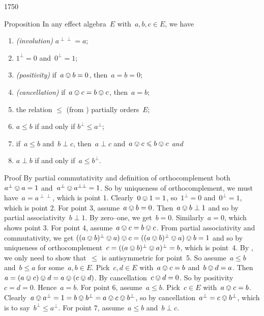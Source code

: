 \begin{parsec}{1750}
\begin{point}{50}{Proposition}%
In any effect algebra~$E$ with~$a,b,c\in E$, we have
\begin{enumerate}
    \item \emph{(involution)}
        $a^{\perp\perp} = a$;
    \item
        $1^\perp= 0$ and~$0^\perp = 1$;
    \item \emph{(positivity)}
        if~$a\ovee b = 0$, then~$a = b= 0$;
    \item \emph{(cancellation)}
        if~$a\ovee c = b\ovee c$, then~$a = b$;
    \item the relation  $\leq$ (from ) partially orders~$E$;
    \item $a \leq b$ if and only if $b^\perp \leq a^\perp$;
    \item if~$a \leq b$ and~$b \perp c$, then~$a \perp c$
        and~$a \ovee c \leq b \ovee c$ \emph{and}
    \item $a \perp b$ if and only if~$a \leq b^\perp$.
\end{enumerate}
\begin{point}{60}{Proof}%
By partial commutativity and definition
of orthocomplement both~$a^\perp \ovee a = 1$
and~$a^\perp \ovee  a^{\perp\perp} = 1$.
So by uniqueness of orthocomplement,
    we must have~$a= a^{\perp\perp}$, which is point 1.
Clearly~$0 \ovee 1 = 1$,
    so~$1^\perp = 0$ and~$0^\perp = 1$,
    which is point 2.
For point 3, assume~$a \ovee b = 0$.
Then~$a \ovee b \perp 1$
    and so by partial associativity~$b \perp 1$.
    By zero--one, we get~$b = 0$.
    Similarly~$a=0$, which shows point 3.
For point 4, assume~$ a \ovee c = b \ovee c$.
From partial associativity and commutativity, we get
$ ((a \ovee b)^\perp\ovee a) \ovee c = 
    ((a \ovee b)^\perp\ovee a) \ovee b  =  1$
and so by uniqueness of
orthocomplement~$c = ((a\ovee b)^\perp\ovee a)^\perp = b$,
    which is point~4.
By ,
    we only need to show that~$\leq$ is antisymmetric
    for point~5.
So assume~$a \leq b$ and~$b \leq a$
    for some~$a,b\in E$.
Pick~$c,d \in E$ with~$a \ovee c = b$ and~$b \ovee d = a$.
Then~$a = (a \ovee c) \ovee d = a \ovee (c \ovee d)$.
By cancellation~$c \ovee d = 0$.
So by positivity~$c = d= 0$.
Hence~$a = b$.
For point 6, assume~$a\leq b$.
Pick~$c \in E$ with~$a \ovee c = b$.
Clearly~$a \ovee a^\perp = 1 = b \ovee b^\perp = a \ovee c \ovee b^\perp$,
so by cancellation~$a^\perp = c \ovee b^\perp$,
    which is to say~$b^\perp \leq a^\perp$.
For point 7, assume~$a \leq b$ and~$b \perp c$.

\end{point}
\end{point}
\end{parsec}
